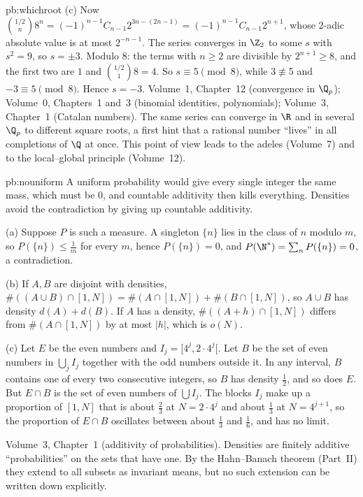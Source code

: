 \begin{solution}{pb:whichroot}
(c) Now $\binom{1/2}n8^n=(-1)^{n-1}C_{n-1}2^{3n-(2n-1)}=(-1)^{n-1}C_{n-1}2^{n+1}$, whose $2$-adic absolute value is at most
$2^{-n-1}$. The series converges in $\Z_2$ to some $s$ with $s^2=9$, so $s=\pm3$. Modulo $8$: the terms with $n\ge2$ are
divisible by $2^{n+1}\ge8$, and the first two are $1$ and $\binom{1/2}18=4$. So $s\equiv5\pmod8$, while $3\not\equiv5$ and
$-3\equiv5\pmod8$. Hence $s=-3$.
\tools Volume~1, Chapter~12 (convergence in $\Q_p$); Volume~0, Chapters~1 and~3 (binomial identities, polynomials); Volume~3,
Chapter~1 (Catalan numbers).
\leads The same series can converge in $\R$ and in several $\Q_p$ to different square roots, a first hint that a rational
number ``lives'' in all completions of $\Q$ at once. This point of view leads to the adeles (Volume~7) and to the local--global
principle (Volume~12).
\end{solution}

\begin{solution}{pb:nouniform}
\idea A uniform probability would give every single integer the same mass, which must be $0$, and countable additivity then
kills everything. Densities avoid the contradiction by giving up countable additivity.

\writeup (a) Suppose $P$ is such a measure. A singleton $\{n\}$ lies in the class of $n$ modulo $m$, so $P(\{n\})\le\frac1m$ for
every $m$, hence $P(\{n\})=0$, and $P(\N^*)=\sum_nP(\{n\})=0$, a contradiction.

(b) If $A,B$ are disjoint with densities, $\#((A\cup B)\cap[1,N])=\#(A\cap[1,N])+\#(B\cap[1,N])$, so $A\cup B$ has density
$d(A)+d(B)$. If $A$ has a density, $\#((A+h)\cap[1,N])$ differs from $\#(A\cap[1,N])$ by at most $|h|$, which is $o(N)$.

(c) Let $E$ be the even numbers and $I_j=[4^j,2\cdot4^j[$. Let $B$ be the set of even numbers in $\bigcup_jI_j$ together with the
odd numbers outside it. In any interval, $B$ contains one of every two consecutive integers, so $B$ has density $\frac12$, and
so does $E$. But $E\cap B$ is the set of even numbers of $\bigcup I_j$. The blocks $I_j$ make up a proportion of $[1,N]$ that is
about $\frac23$ at $N=2\cdot4^j$ and about $\frac13$ at $N=4^{j+1}$, so the proportion of $E\cap B$ oscillates between about
$\frac13$ and $\frac16$, and has no limit.

\tools Volume~3, Chapter~1 (additivity of probabilities).
\leads Densities are finitely additive ``probabilities'' on the sets that have one. By the Hahn--Banach theorem (Part~II) they
extend to all subsets as invariant means, but no such extension can be written down explicitly.
\end{solution}

